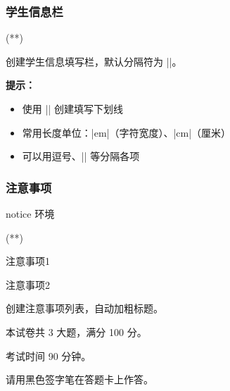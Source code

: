\subsubsection{学生信息栏}

\begin{function}{\information}
  \begin{examzhsyntax}
    \information(**)
  \end{examzhsyntax}

  创建学生信息填写栏，默认分隔符为 |\quad|。
\end{function}

\begin{latexcode}
\end{latexcode}

\textbf{提示：}
\begin{itemize}
  \item 使用 |\underline{\hspace{长度}}| 创建填写下划线
  \item 常用长度单位：|em|（字符宽度）、|cm|（厘米）
  \item 可以用逗号、|\quad| 等分隔各项
\end{itemize}

\subsubsection{注意事项}

\begin{function}{notice 环境}
  \begin{examzhsyntax}
    \begin{notice}(**)
      \item 注意事项1
      \item 注意事项2
    \end{notice}
  \end{examzhsyntax}

  创建注意事项列表，自动加粗标题。
\end{function}

\begin{latexcode}
  \begin{notice}
    \item 本试卷共 3 大题，满分 100 分。
    \item 考试时间 90 分钟。
    \item 请用黑色签字笔在答题卡上作答。
  \end{notice}
\end{latexcode}

